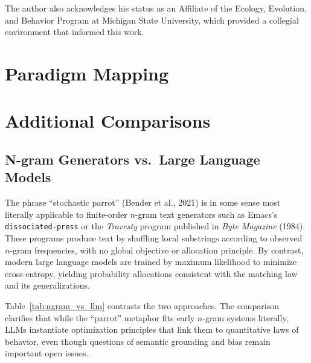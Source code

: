 \documentclass[11pt]{article}
\begin{document}
The author also acknowledges his status as an Affiliate of the Ecology, Evolution, and Behavior Program at Michigan State University, which provided a collegial environment that informed this work.


\section{Paradigm Mapping}





\appendix
\section{Additional Comparisons}
\label{app:ngram}

\subsection{N-gram Generators vs.\ Large Language Models}

The phrase ``stochastic parrot'' (Bender et al., 2021) is in some sense most
literally applicable to finite-order $n$-gram text generators such as Emacs’s
\texttt{dissociated-press} or the \emph{Travesty} program published in
\emph{Byte Magazine} (1984). These programs produce text by shuffling local
substrings according to observed $n$-gram frequencies, with no global objective
or allocation principle. By contrast, modern large language models are trained
by maximum likelihood to minimize cross-entropy, yielding probability
allocations consistent with the matching law and its generalizations.

Table~\ref{tab:ngram_vs_llm} contrasts the two approaches. The comparison
clarifies that while the ``parrot'' metaphor fits early $n$-gram systems
literally, LLMs instantiate optimization principles that link them to
quantitative laws of behavior, even though questions of semantic grounding and
bias remain important open issues.
\end{document}
